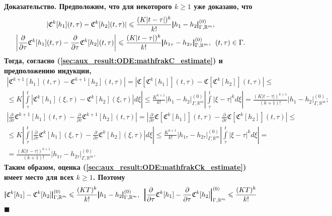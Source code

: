 \documentclass{report}
\newenvironment{Proof}{\par\noindent\bf Доказательство.\rm}{ $\blacksquare$\par}
\begin{document}
\begin{Proof}
Предположим, что для некоторого $k\geqslant1$ уже доказано, что
\begin{gather}\label{sec:aux_result:ODE:mathfrakCk_estimate}
|\mathfrak{C}^k[h_1](t,\tau)-\mathfrak{C}^k[h_2](t,\tau)|\leqslant\frac{(K|t-\tau|)^k}{k!}\pmb{|}h_1-h_2\pmb{|}^{(0)}_{\Gamma,\mathbb{R}^m},\\
\notag \left|\frac{\partial}{\partial\tau}\mathfrak{C}^k[h_1](t,\tau)-\frac{\partial}{\partial\tau}\mathfrak{C}^k[h_2](t,\tau)
\right|\leqslant \frac{(K|t-\tau|)^k}{k!}\pmb{|}h_{1\tau}-h_{2\tau}\pmb{|}^{(0)}_{\Gamma,\mathbb{R}^m},\,\,\,(t,\tau)\in\Gamma.
\end{gather}
Тогда, согласно (\ref{sec:aux_result:ODE:mathfrakC_estimate}) и предположению индукции,
\begin{gather*}
|\mathfrak{C}^{k+1}[h_1](t,\tau)-\mathfrak{C}^{k+1}[h_2](t,\tau)|=|\mathfrak{C}[\mathfrak{C}^k[h_1]](t,\tau)-\mathfrak{C}[\mathfrak{C}^k[h_2]](t,\tau)|\leqslant\\
\leqslant K\left|\int\limits_\tau^t|\mathfrak{C}^k[h_1](\xi,\tau)-\mathfrak{C}^k[h_2](\xi,\tau)|d\xi\right|\leqslant\frac{K^{k+1}}{k!}\pmb{|}h_1-h_2\pmb{|}^{(0)}_{\Gamma,\mathbb{R}^m}
\left|\int\limits_\tau^t|\xi-\tau|^kd\xi\right|=\frac{(K|t-\tau|)^{k+1}}{(k+1)!}\pmb{|}h_1-h_2\pmb{|}^{(0)}_{\Gamma,\mathbb{R}^m};\\
%
\left|\frac{\partial}{\partial\tau}\mathfrak{C}^{k+1}[h_1](t,\tau)-\frac{\partial}{\partial\tau}\mathfrak{C}^{k+1}[h_2](t,\tau)\right|=\left|\frac{\partial}{\partial\tau}\mathfrak{C}[
\mathfrak{C}^k[h_1]](t,\tau)-\frac{\partial}{\partial\tau}\mathfrak{C}[\mathfrak{C}^k[h_2]](t,\tau)\right|\leqslant\\
\leqslant K\left|\int\limits_\tau^t\left|\frac{\partial}{\partial\tau}\mathfrak{C}^k[h_1](\xi,\tau)-\frac{\partial}{\partial\tau}\mathfrak{C}^k[h_2](\xi,\tau)\right|d\xi\right|\leqslant
\frac{K^{k+1}}{k!}\pmb{|}h_{1\tau}-h_{2\tau}\pmb{|}^{(0)}_{\Gamma,\mathbb{R}^m}\left|\int\limits_\tau^t|\xi-\tau|^kd\xi\right|=\\
=\frac{(K|t-\tau|)^{k+1}}{(k+1)!}\pmb{|}h_{1\tau}-h_{2\tau}\pmb{|}^{(0)}_{\Gamma,\mathbb{R}^m}.
\end{gather*}
Таким образом, оценка (\ref{sec:aux_result:ODE:mathfrakCk_estimate}) имеет место для всех $k\geqslant1$. Поэтому
\begin{gather*}
\pmb{|}\mathfrak{C}^k[h_1]-\mathfrak{C}^k[h_2]\pmb{|}^{(0)}_{\Gamma,\mathbb{R}^m}\leqslant\frac{(KT)^k}{k!}\pmb{|}h_{1}-h_{2}\pmb{|}^{(0)}_{\Gamma,\mathbb{R}^m},\,\,\,
\pmb{\Bigl|}\frac{\partial}{\partial\tau}\mathfrak{C}^k[h_1]- \frac{\partial}{\partial\tau}\mathfrak{C}^k[h_2]{\pmb{\Bigr|}}^{(0)}_{\Gamma,\mathbb{R}^m} \leqslant\frac{(KT)^k}{k!}

\end{gather*}
\end{Proof}
\end{document}
